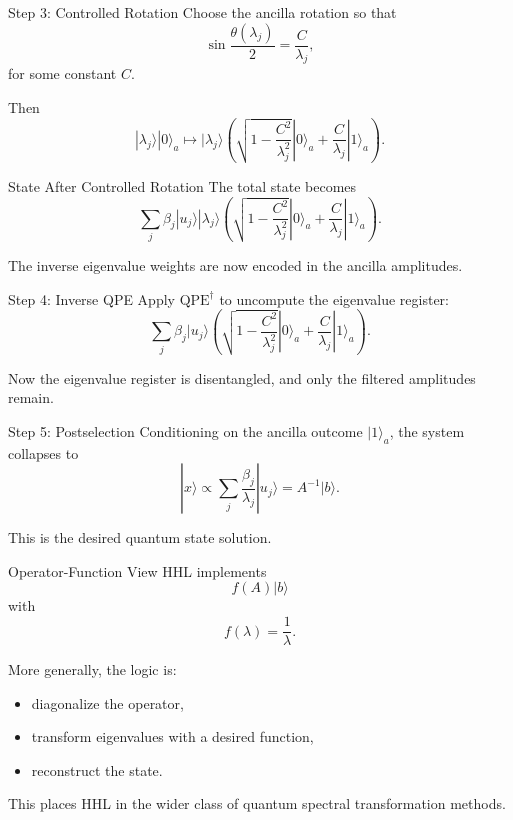 \documentclass{beamer}
\begin{document}

\begin{frame}{Step 3: Controlled Rotation}
Choose the ancilla rotation so that
\[
\sin\frac{\theta(\lambda_j)}{2} = \frac{C}{\lambda_j},
\]
for some constant \(C\).

Then
\[
|\lambda_j\rangle |0\rangle_a
\mapsto
|\lambda_j\rangle
\left(
\sqrt{1-\frac{C^2}{\lambda_j^2}}|0\rangle_a
+
\frac{C}{\lambda_j}|1\rangle_a
\right).
\]
\end{frame}


\begin{frame}{State After Controlled Rotation}
The total state becomes
\[
\sum_j \beta_j |u_j\rangle |\lambda_j\rangle
\left(
\sqrt{1-\frac{C^2}{\lambda_j^2}}|0\rangle_a
+
\frac{C}{\lambda_j}|1\rangle_a
\right).
\]

The inverse eigenvalue weights are now encoded in the ancilla amplitudes.
\end{frame}


\begin{frame}{Step 4: Inverse QPE}
Apply \( \text{QPE}^{\dagger} \) to uncompute the eigenvalue register:
\[
\sum_j \beta_j |u_j\rangle
\left(
\sqrt{1-\frac{C^2}{\lambda_j^2}}|0\rangle_a
+
\frac{C}{\lambda_j}|1\rangle_a
\right).
\]

Now the eigenvalue register is disentangled, and only the filtered amplitudes remain.
\end{frame}


\begin{frame}{Step 5: Postselection}
Conditioning on the ancilla outcome \(|1\rangle_a\), the system collapses to
\[
|x\rangle \propto \sum_j \frac{\beta_j}{\lambda_j}|u_j\rangle
= A^{-1}|b\rangle.
\]

This is the desired quantum state solution.
\end{frame}


\begin{frame}{Operator-Function View}
HHL implements
\[
f(A)|b\rangle
\]
with
\[
f(\lambda)=\frac{1}{\lambda}.
\]

More generally, the logic is:
\begin{itemize}
\item diagonalize the operator,
\item transform eigenvalues with a desired function,
\item reconstruct the state.
\end{itemize}

This places HHL in the wider class of quantum spectral transformation methods.
\end{frame}
\end{document}

